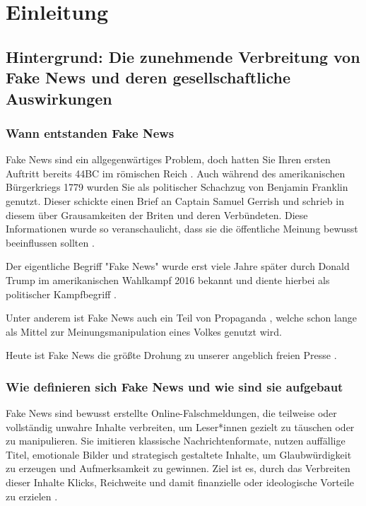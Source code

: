 \chapter{Einleitung}
\label{chap:einleitung}

\section{Hintergrund: Die zunehmende Verbreitung von Fake News und deren gesellschaftliche Auswirkungen}
\label{sec:hintergrund}

\subsection{Wann entstanden Fake News}

Fake News sind ein allgegenwärtiges Problem, doch hatten Sie Ihren ersten Auftritt bereits 44BC im römischen Reich \cite{socsci9100185}.
Auch während des amerikanischen Bürgerkriegs 1779 wurden Sie als politischer Schachzug von Benjamin Franklin genutzt.
Dieser schickte einen Brief an Captain Samuel Gerrish und schrieb in diesem über Grausamkeiten der Briten und deren Verbündeten. 
Diese Informationen wurde so veranschaulicht, dass sie die öffentliche Meinung bewusst beeinflussen sollten \cite{Sharma:2024}.

Der eigentliche Begriff "Fake News" wurde erst viele Jahre später durch Donald Trump im amerikanischen Wahlkampf 2016 bekannt \cite{Ashish2024} 
und diente hierbei als politischer Kampfbegriff \cite{buerker2022fakenews}.

Unter anderem ist Fake News auch ein Teil von Propaganda \cite{buerker2022fakenews}, welche schon lange als Mittel zur Meinungsmanipulation eines Volkes genutzt wird.

Heute ist Fake News die größte Drohung zu unserer angeblich freien Presse \cite{Sharma:2024}.

\subsection{Wie definieren sich Fake News und wie sind sie aufgebaut}
\label{sec:wie_definieren_sich_fake_news}

Fake News sind bewusst erstellte Online-Falschmeldungen, die teilweise oder vollständig unwahre Inhalte verbreiten, 
um Leser*innen gezielt zu täuschen oder zu manipulieren. Sie imitieren klassische Nachrichtenformate, nutzen auffällige Titel, emotionale Bilder und strategisch gestaltete
Inhalte, um Glaubwürdigkeit zu erzeugen und Aufmerksamkeit zu gewinnen. Ziel ist es, durch das Verbreiten dieser Inhalte Klicks, Reichweite und damit finanzielle oder ideologische Vorteile zu
erzielen \cite{socsci9100185}.

